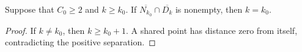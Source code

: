 \begin{lemma}
    \label{thm:area_law_dummy_contact_index}
    \leanok
    Suppose that $C_0\ge2$ and $k\ge k_0$. If
    $\overline{N_{k_0}}\cap\overline{D_k}$ is nonempty, then $k=k_0$.
\end{lemma}
\begin{proof}\leanok
    If $k\ne k_0$, then $k\ge k_0+1$. A shared point has distance
    zero from itself, contradicting the positive separation.
\end{proof}
